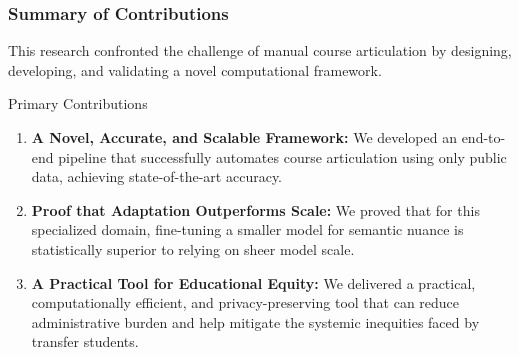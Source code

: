 \documentclass[aspectratio=169,10pt]{beamer}
\begin{document}
\begin{frame}
\begin{columns}[T]
\begin{column}{0.5\textwidth}
        \end{column}
    \end{columns}
    
    
\end{frame}

\begin{frame}
    \frametitle{Summary of Contributions}
    
    This research confronted the challenge of manual course articulation by designing, developing, and validating a novel computational framework.

    \vspace{3mm}
    \begin{alertblock}{Primary Contributions}
        \begin{enumerate}
            \item \textbf{A Novel, Accurate, and Scalable Framework:} We developed an end-to-end pipeline that successfully automates course articulation using only public data, achieving state-of-the-art accuracy.
            
            \item \textbf{Proof that Adaptation Outperforms Scale:} We proved that for this specialized domain, fine-tuning a smaller model for semantic nuance is statistically superior to relying on sheer model scale.
            
            \item \textbf{A Practical Tool for Educational Equity:} We delivered a practical, computationally efficient, and privacy-preserving tool that can reduce administrative burden and help mitigate the systemic inequities faced by transfer students.
        \end{enumerate}
    \end{alertblock}
\end{frame}
\end{document}
